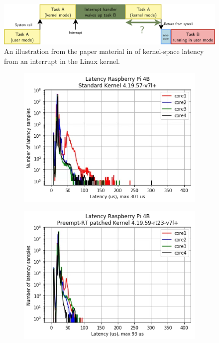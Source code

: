 \begin{figure}[H]
    \centering
    \includegraphics[width=1\textwidth]{assets/bootlin-interrupt-flow.png}
    \caption{An illustration from the paper material in \cite{bootlinUnderstandingLinuxRealtime2024} of kernel-space latency from an interrupt in the Linux kernel.}
    \label{fig:bootlin_flow}
\end{figure}

\begin{figure}[H]
    \centering
    \begin{subfigure}{.49\textwidth}
        \centering
        \includegraphics[width=1\linewidth]{assets/lemariva-std-kernel-latency.png}
        \caption{}
        \label{fig:std_latency}
    \end{subfigure}
    \hfill
    \begin{subfigure}{.49\textwidth}
        \centering
        \includegraphics[width=1\linewidth]{assets/lemariva-rt-kernel-latency.png}

\end{subfigure}
\end{figure}
